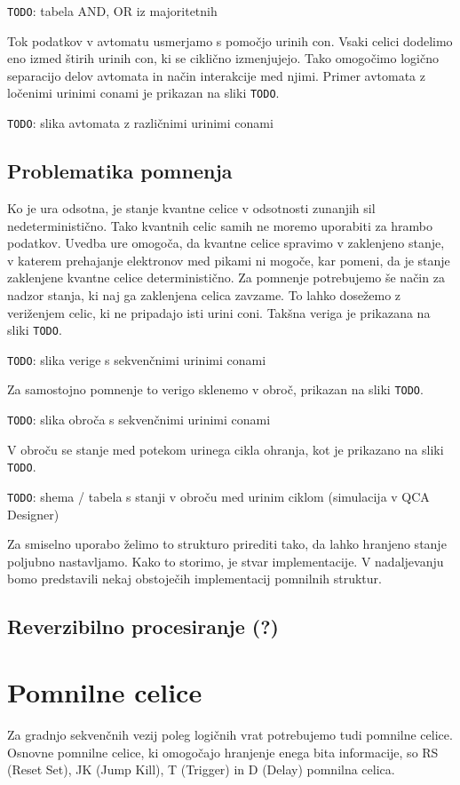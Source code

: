 \documentclass[a4paper, 11pt]{article}
\newcommand{\todo}{\textcolor{BrickRed}{\texttt{TODO}}} %
\begin{document}
\todo: tabela AND, OR iz majoritetnih

Tok podatkov v avtomatu usmerjamo s pomočjo urinih con.
Vsaki celici dodelimo eno izmed štirih urinih con, ki se ciklično izmenjujejo.
Tako omogočimo logično separacijo delov avtomata in način interakcije med njimi.
Primer avtomata z ločenimi urinimi conami je prikazan na sliki \todo.

\todo: slika avtomata z različnimi urinimi conami

\subsection{Problematika pomnenja}

Ko je ura odsotna, je stanje kvantne celice v odsotnosti zunanjih sil nedeterministično.
Tako kvantnih celic samih ne moremo uporabiti za hrambo podatkov.
Uvedba ure omogoča, da kvantne celice spravimo v zaklenjeno stanje, v katerem prehajanje elektronov med pikami ni mogoče, kar pomeni, da je stanje zaklenjene kvantne celice deterministično.
Za pomnenje potrebujemo še način za nadzor stanja, ki naj ga zaklenjena celica zavzame.
To lahko dosežemo z veriženjem celic, ki ne pripadajo isti urini coni.
Takšna veriga je prikazana na sliki \todo.

\todo: slika verige s sekvenčnimi urinimi conami

Za samostojno pomnenje to verigo sklenemo v obroč, prikazan na sliki \todo.

\todo: slika obroča s sekvenčnimi urinimi conami

V obroču se stanje med potekom urinega cikla ohranja, kot je prikazano na sliki \todo.

\todo: shema / tabela s stanji v obroču med urinim ciklom (simulacija v QCA Designer)

Za smiselno uporabo želimo to strukturo prirediti tako, da lahko hranjeno stanje poljubno nastavljamo.
Kako to storimo, je stvar implementacije.
V nadaljevanju bomo predstavili nekaj obstoječih implementacij pomnilnih struktur.

\subsection{Reverzibilno procesiranje (?)}



\section{Pomnilne celice}
Za gradnjo sekvenčnih vezij poleg logičnih vrat potrebujemo tudi pomnilne celice. Osnovne pomnilne celice, ki omogočajo hranjenje enega bita informacije, so RS (Reset Set), JK (Jump Kill), T (Trigger) in D (Delay) pomnilna celica. 
\end{document}
